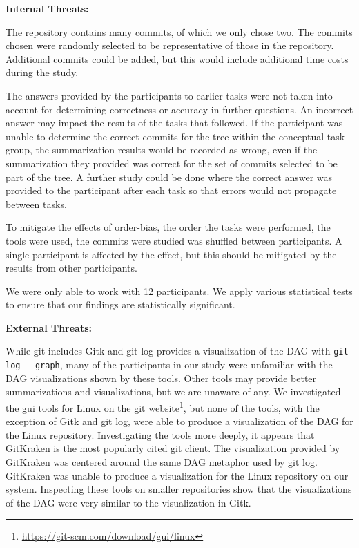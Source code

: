 \textbf{Internal Threats:}

The repository contains many commits, of which we only chose two. The
commits chosen were randomly selected to be representative of those in
the repository. Additional commits could be added, but this would
include additional time costs during the study.

The answers provided by the participants to earlier tasks were not taken
into account for determining correctness or accuracy in further
questions. An incorrect answer may impact the results of the tasks that
followed. If the participant was unable to determine the correct commits
for the tree within the conceptual task group, the summarization results
would be recorded as wrong, even if the summarization they provided was
correct for the set of commits selected to be part of the tree. A
further study could be done where the correct answer was provided to the
participant after each task so that errors would not propagate between
tasks.

To mitigate the effects of order-bias, the order the tasks were
performed, the tools were used, the commits were studied was shuffled
between participants. A single participant is affected by the effect,
but this should be mitigated by the results from other participants.

We were only able to work with 12 participants. We apply various
statistical tests to ensure that our findings are statistically significant.

\textbf{External Threats:}

While git includes Gitk and git log provides a visualization of the DAG
with \verb|git log --graph|, many of the participants in our study were
unfamiliar with the DAG visualizations shown by these tools. Other tools
may provide better summarizations and visualizations, but we are unaware
of any. We investigated the gui tools for Linux on the git
website\footnote{\url{https://git-scm.com/download/gui/linux}}, but none
of the tools, with the exception of Gitk and git log, were able to
produce a visualization of the DAG for the Linux repository.
Investigating the tools more deeply, it appears that GitKraken is the
most popularly cited git client. The visualization provided by GitKraken
was centered around the same DAG metaphor used by git log. GitKraken was
unable to produce a visualization for the Linux repository on our
system. Inspecting these tools on smaller repositories show that the
visualizations of the DAG were very similar to the visualization in
Gitk.

